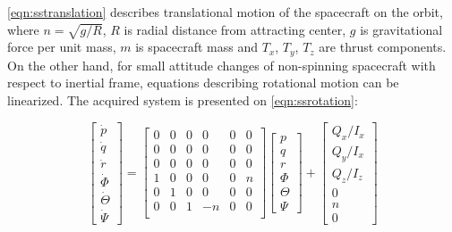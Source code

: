     \autoref{eqn:sstranslation} describes translational motion of the spacecraft on the orbit, where $n = \sqrt{g/R}$, $R$ is radial distance from attracting center, $g$ is gravitational force per unit mass, $m$ is spacecraft mass and $T_x$, $T_y$, $T_z$ are thrust components. On the other hand, for small attitude changes of non-spinning spacecraft with respect to inertial frame, equations describing rotational motion can be linearized. The acquired system is presented on \autoref{eqn:ssrotation}:

    \begin{equation}
        \begin{bmatrix}
        \dot{p} \\
        \dot{q} \\
        \dot{r} \\
        \dot{\Phi} \\
        \dot{\Theta} \\
        \dot{\Psi}
        \end{bmatrix}
        =
        \begin{bmatrix}
            0 & 0 & 0 & 0 & 0 & 0 \\
            0 & 0 & 0 & 0 & 0 & 0 \\
            0 & 0 & 0 & 0 & 0 & 0 \\
            1 & 0 & 0 & 0 & 0 & n \\
            0 & 1 & 0 & 0 & 0 & 0 \\
            0 & 0 & 1 & -n & 0 & 0 \\ 
        \end{bmatrix}
        \begin{bmatrix}
            p \\
            q \\
            r \\
            \Phi \\
            \Theta \\
            \Psi
        \end{bmatrix}
        +
        \begin{bmatrix}
            Q_x/I_x \\
            Q_y/I_x \\
            Q_z/I_z \\
            0 \\
            n \\
            0
            \end{bmatrix}
    \end{equation}\label{eqn:ssrotation}

